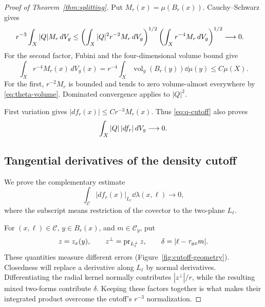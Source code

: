 \begin{proof}[Proof of Theorem~\ref{thm:splitting}]
Put \(M_r(x)=\mu(B_r(x))\). Cauchy--Schwarz gives
\begin{align}
r^{-3}\int_X|Q|M_r\,dV_g
&\le
\left(\int_X|Q|^2r^{-2}M_r\,dV_g\right)^{1/2}
\left(\int_Xr^{-4}M_r\,dV_g\right)^{1/2}
\longrightarrow0.
\label{eq:q-cutoff}
\end{align}
For the second factor, Fubini and the four-dimensional
volume bound give
\[
\int_Xr^{-4}M_r(x)\,dV_g(x)
=r^{-4}\int_X\operatorname{vol}_g(B_r(y))\dd\mu(y)
\le C\mu(X).
\]
For the first, \(r^{-2}M_r\) is bounded and tends to zero
volume-almost everywhere by \eqref{eq:theta-volume}.
Dominated convergence applies to \(|Q|^2\).

First variation gives \(|df_r(x)|\le Cr^{-3}M_r(x)\).
Thus \eqref{eq:q-cutoff} also proves
\begin{equation}\label{eq:q-full-derivative}
\int_X|Q|\,|df_r|\,dV_g\longrightarrow0.
\end{equation}

\subsection*{Tangential derivatives of the density cutoff}

We prove the complementary estimate
\begin{equation}\label{eq:tangential-cutoff}
\int_{\mathscr C}|df_r(x)|_{L_\ell}\dd\lambda(x,\ell)
\longrightarrow0,
\end{equation}
where the subscript means restriction of the covector to
the two-plane \(L_\ell\).

For \((x,\ell)\in\mathscr C\), \(y\in B_r(x)\), and
\(m\in\mathscr C_y\), put
\[
z=z_x(y),\qquad z^\perp=\operatorname{pr}_{L_\ell^\perp}z,
\qquad \delta=|\ell-\tau_{yx}m|.
\]
These quantities measure different errors
(Figure~\ref{fig:cutoff-geometry}). Closedness will replace a
derivative along \(L_\ell\) by normal derivatives. Differentiating
the radial kernel normally contributes \(|z^\perp|/r\), while
the resulting mixed two-forms contribute \(\delta\).
Keeping these factors together is what makes their integrated
product overcome the cutoff's \(r^{-3}\) normalization.


\end{proof}
